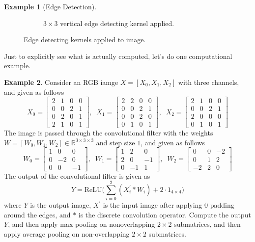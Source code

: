 \documentclass{article}
\theoremstyle{definition}
\newtheorem{example}{Example}[section]
\theoremstyle{remark}
\theoremstyle{definition}
\begin{document}
\begin{example}[Edge Detection]
\begin{figure}[hbt!]
\begin{subfigure}[b]{0.45\textwidth}
        \caption{$3 \times 3$ vertical edge detecting kernel applied. }
        \label{fig:vertical_edge}
    \end{subfigure}

    \label{fig:edge_detection}
    \caption{Edge detecting kernels applied to image. }
\end{figure}
\end{example}

Just to explicitly see what is actually computed, let's do one computational example. 

\begin{example} 
    Consider an RGB iamge $X = [X_0, X_1, X_2]$ with three channels, and given as follows 
    \[X_0 = \begin{bmatrix} 2 & 1 & 0 & 0 \\ 0 & 0 & 2 & 1 \\ 0 & 2 & 0 & 1 \\ 2 & 1 & 0 & 1 \end{bmatrix}, \;\; X_1 = \begin{bmatrix} 2 & 2 & 0 & 0 \\ 0 & 0 & 2 & 1 \\ 0 & 0 & 2 & 0 \\ 0 & 1 & 0 & 1 \end{bmatrix}, \;\; X_2 = \begin{bmatrix} 2 & 1 & 0 & 0 \\ 0 & 0 & 2 & 1 \\ 2 & 0 & 0 & 0 \\ 0 & 1 & 0 & 1 \end{bmatrix}\]
    The image is passed through the convolutional filter with the weights $W = [W_0, W_1, W_2] \in \mathbb{R}^{3 \times 3 \times 3}$ and step size $1$, and given as follows 
    \[W_0 = \begin{bmatrix} 1 & 0 & 0 \\ 0 & -2 & 0 \\ 0 & 0 & -1 \end{bmatrix}, \;\; W_1 = \begin{bmatrix} 1 & 2 & 0 \\ 2 & 0 & - 1 \\ 0 & -1 & 1 \end{bmatrix}, \;\; W_2 = \begin{bmatrix} 0 & 0 & -2 \\ 0 & 1 & 2 \\ -2 & 2 & 0 \end{bmatrix} \]
The output of the convolutional filter is given as 
\[Y = \mathrm{ReLU} \bigg( \sum_{i=0}^2 (X_i^\prime \ast W_i) + 2 \cdot 1_{4 \times 4}\bigg)\]
where $Y$ is the output image, $X^\prime$ is the input image after applying $0$ padding around the edges, and $\ast$ is the discrete convolution operator. Compute the output $Y$, and then apply max pooling on nonoverlapping $2 \times 2$ submatrices, and then apply average pooling on non-overlapping $2 \times 2$ submatrices. 
\end{example}
\end{document}
